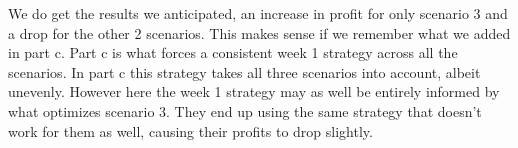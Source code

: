 We do get the results we anticipated, an increase in profit for only scenario 3 and a drop for the other 2 scenarios. This makes sense if we remember what we added in part c. Part c is what forces a consistent week 1 strategy across all the scenarios. In part c this strategy takes all three scenarios into account, albeit unevenly. However here the week 1 strategy may as well be entirely informed by what optimizes scenario 3. They end up using the same strategy that doesn't work for them as well, causing their profits to drop slightly.
